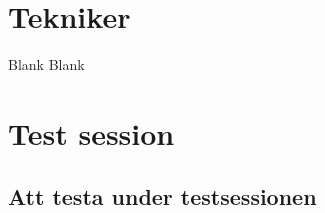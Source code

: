 
\appendix

\chapter{Tekniker}
\newpage
Blank
\newpage
Blank

\appendix

\chapter{Test session}

\section{Att testa under testsessionen}
